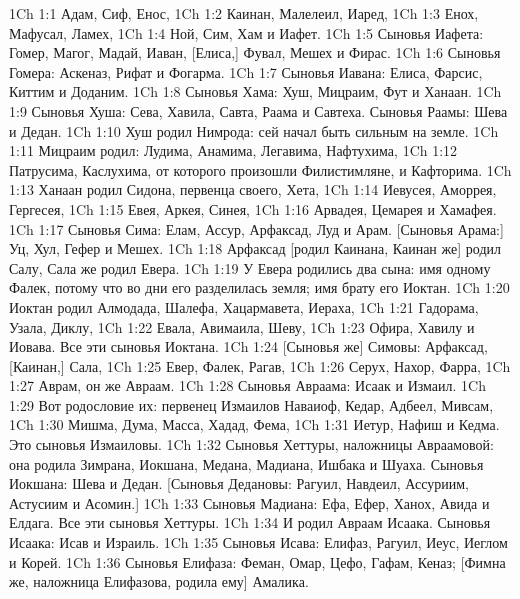 \vs 1Ch 1:1 Адам, Сиф, Енос,
\vs 1Ch 1:2 Каинан, Малелеил, Иаред,
\vs 1Ch 1:3 Енох, Мафусал, Ламех,
\vs 1Ch 1:4 Ной, Сим, Хам и Иафет.
\rsbpar\vs 1Ch 1:5 Сыновья Иафета: Гомер, Магог, Мадай, Иаван, [Елиса,] Фувал, Мешех и Фирас.
\vs 1Ch 1:6 Сыновья Гомера: Аскеназ, Рифат и Фогарма.
\vs 1Ch 1:7 Сыновья Иавана: Елиса, Фарсис, Киттим и Доданим.
\rsbpar\vs 1Ch 1:8 Сыновья Хама: Хуш, Мицраим, Фут и Ханаан.
\vs 1Ch 1:9 Сыновья Хуша: Сева, Хавила, Савта, Раама и Савтеха. Сыновья Раамы: Шева и Дедан.
\vs 1Ch 1:10 Хуш родил  Нимрода: сей начал быть сильным на земле.
\vs 1Ch 1:11 Мицраим родил: Лудима, Анамима, Легавима, Нафтухима,
\vs 1Ch 1:12 Патрусима, Каслухима, от которого произошли Филистимляне, и Кафторима.
\vs 1Ch 1:13 Ханаан родил Сидона, первенца своего, Хета,
\vs 1Ch 1:14 Иевусея, Аморрея, Гергесея,
\vs 1Ch 1:15 Евея, Аркея, Синея,
\vs 1Ch 1:16 Арвадея, Цемарея и Хамафея.
\rsbpar\vs 1Ch 1:17 Сыновья Сима: Елам, Ассур, Арфаксад, Луд и Арам. [Сыновья Арама:] Уц, Хул, Гефер и Мешех.
\vs 1Ch 1:18 Арфаксад [родил Каинана, Каинан же] родил Салу, Сала же родил Евера.
\vs 1Ch 1:19 У Евера родились два сына: имя одному Фалек, потому что во дни его разделилась земля; имя брату его Иоктан.
\vs 1Ch 1:20 Иоктан родил Алмодада, Шалефа, Хацармавета, Иераха,
\vs 1Ch 1:21 Гадорама, Узала, Диклу,
\vs 1Ch 1:22 Евала, Авимаила, Шеву,
\vs 1Ch 1:23 Офира, Хавилу и Иовава. Все эти сыновья Иоктана.
\vs 1Ch 1:24 [Сыновья же] Симовы: Арфаксад, [Каинан,] Сала,
\vs 1Ch 1:25 Евер, Фалек, Рагав,
\vs 1Ch 1:26 Серух, Нахор, Фарра,
\vs 1Ch 1:27 Аврам, он же Авраам.
\rsbpar\vs 1Ch 1:28 Сыновья Авраама: Исаак и Измаил.
\vs 1Ch 1:29 Вот родословие их: первенец Измаилов Наваиоф,  Кедар, Адбеел, Мивсам,
\vs 1Ch 1:30 Мишма, Дума, Масса, Хадад, Фема,
\vs 1Ch 1:31 Иетур, Нафиш и Кедма. Это сыновья Измаиловы.
\vs 1Ch 1:32 Сыновья Хеттуры, наложницы Авраамовой: она родила Зимрана, Иокшана, Медана, Мадиана, Ишбака и Шуаха. Сыновья Иокшана: Шева и Дедан. [Сыновья Дедановы: Рагуил, Навдеил, Ассуриим, Астусиим и Асомин.]
\vs 1Ch 1:33 Сыновья Мадиана: Ефа, Ефер, Ханох, Авида и Елдага. Все эти сыновья Хеттуры.
\rsbpar\vs 1Ch 1:34 И родил Авраам Исаака. Сыновья Исаака: Исав и Израиль.
\rsbpar\vs 1Ch 1:35 Сыновья Исава: Елифаз, Рагуил, Иеус, Иеглом и Корей.
\vs 1Ch 1:36 Сыновья Елифаза: Феман, Омар, Цефо, Гафам, Кеназ; [Фимна же, наложница Елифазова, родила ему] Амалика.
